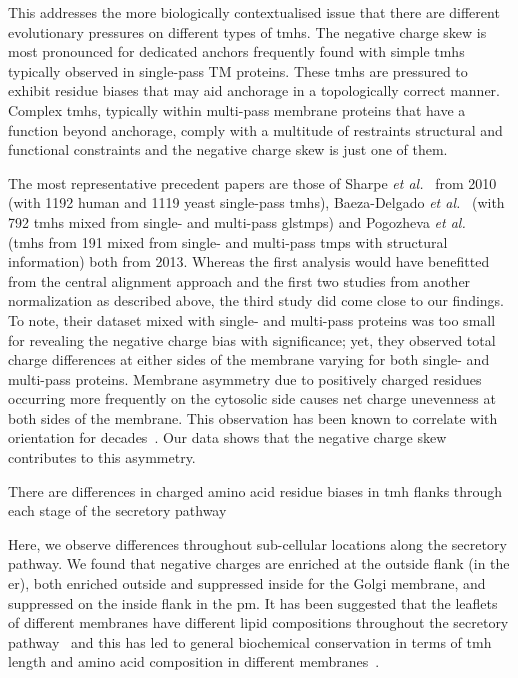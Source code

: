 \begin{enumerate}[i]
 This addresses the more biologically contextualised issue that there are different evolutionary pressures on different types of \gls{tmh}s.
The negative charge skew is most pronounced for dedicated anchors frequently found with simple \gls{tmh}s typically observed in single-pass TM proteins.
These \gls{tmh}s are pressured to exhibit residue biases that may aid anchorage in a topologically correct manner.
Complex \gls{tmh}s, typically within multi-pass membrane proteins that have a function beyond anchorage, comply with a multitude of restraints structural and functional constraints and the negative charge skew is just one of them.
\end{enumerate}

The most representative precedent papers are those of Sharpe \textit{et al.}~\cite{Sharpe2010} from 2010 (with 1192 human and 1119 yeast single-pass \gls{tmh}s), Baeza-Delgado \textit{et al.}~\cite{Baeza-Delgado2013} (with 792 \gls{tmh}s mixed from single- and multi-pass gls{tmp}s) and Pogozheva \textit{et al.}~\cite{Pogozheva2013} (\gls{tmh}s from 191 mixed from single- and multi-pass \gls{tmp}s with structural information) both from 2013.
Whereas the first analysis would have benefitted from the central alignment approach and the first two studies from another normalization as described above, the third study did come close to our findings.
To note, their dataset mixed with single- and multi-pass proteins was too small for revealing the negative charge bias with significance; yet, they observed total charge differences at either sides of the membrane varying for both single- and multi-pass proteins.
Membrane asymmetry due to positively charged residues occurring more frequently on the cytosolic side causes net charge unevenness at both sides of the membrane.
This observation has been known to correlate with orientation for decades~\cite{VonHeijne1989, Baeza-Delgado2013, Meindl-Beinker2006}.
Our data shows that the negative charge skew contributes to this asymmetry.

There are differences in charged amino acid residue biases in \gls{tmh} flanks through each stage of the secretory pathway

Here, we observe differences throughout sub-cellular locations along the secretory pathway.
We found that negative charges are enriched at the outside flank (in the \gls{er}), both enriched outside and suppressed inside for the Golgi membrane, and suppressed on the inside flank in the \gls{pm}.
It has been suggested that the leaflets of different membranes have different lipid compositions throughout the secretory pathway~\cite{VanMeer2008} and this has led to general biochemical conservation in terms of \gls{tmh} length and amino acid composition in different membranes~\cite{Sharpe2010, Pogozheva2013}.

